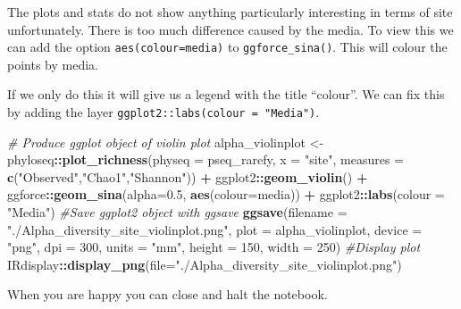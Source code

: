\documentclass[
]{book}
\newenvironment{Shaded}{\begin{snugshade}}{\end{snugshade}}
\newcommand{\AttributeTok}[1]{\textcolor[rgb]{0.13,0.29,0.53}{#1}}
\newcommand{\CommentTok}[1]{\textcolor[rgb]{0.56,0.35,0.01}{\textit{#1}}}
\newcommand{\DecValTok}[1]{\textcolor[rgb]{0.00,0.00,0.81}{#1}}
\newcommand{\FloatTok}[1]{\textcolor[rgb]{0.00,0.00,0.81}{#1}}
\newcommand{\FunctionTok}[1]{\textcolor[rgb]{0.13,0.29,0.53}{\textbf{#1}}}
\newcommand{\NormalTok}[1]{#1}
\newcommand{\OtherTok}[1]{\textcolor[rgb]{0.56,0.35,0.01}{#1}}
\newcommand{\SpecialCharTok}[1]{\textcolor[rgb]{0.81,0.36,0.00}{\textbf{#1}}}
\newcommand{\StringTok}[1]{\textcolor[rgb]{0.31,0.60,0.02}{#1}}
\begin{document}
The plots and stats do not show anything particularly interesting in terms of site unfortunately.
There is too much difference caused by the media.
To view this we can add the option \texttt{aes(colour=media)} to \texttt{ggforce\_sina()}.
This will colour the points by media.

If we only do this it will give us a legend with the title ``colour''.
We can fix this by adding the layer \texttt{ggplot2::labs(colour\ =\ "Media")}.

\begin{Shaded}
\begin{Highlighting}[]
\CommentTok{\# Produce ggplot object of violin plot}
\NormalTok{alpha\_violinplot }\OtherTok{\textless{}{-}}\NormalTok{ phyloseq}\SpecialCharTok{::}\FunctionTok{plot\_richness}\NormalTok{(}\AttributeTok{physeq =}\NormalTok{ pseq\_rarefy, }
                        \AttributeTok{x =} \StringTok{"site"}\NormalTok{,}
                        \AttributeTok{measures =} \FunctionTok{c}\NormalTok{(}\StringTok{"Observed"}\NormalTok{,}\StringTok{"Chao1"}\NormalTok{,}\StringTok{"Shannon"}\NormalTok{)) }\SpecialCharTok{+}
\NormalTok{                          ggplot2}\SpecialCharTok{::}\FunctionTok{geom\_violin}\NormalTok{() }\SpecialCharTok{+}
\NormalTok{                          ggforce}\SpecialCharTok{::}\FunctionTok{geom\_sina}\NormalTok{(}\AttributeTok{alpha=}\FloatTok{0.5}\NormalTok{, }\FunctionTok{aes}\NormalTok{(}\AttributeTok{colour=}\NormalTok{media)) }\SpecialCharTok{+}
\NormalTok{                          ggplot2}\SpecialCharTok{::}\FunctionTok{labs}\NormalTok{(}\AttributeTok{colour =} \StringTok{"Media"}\NormalTok{)}
\CommentTok{\#Save ggplot2 object with ggsave}
\FunctionTok{ggsave}\NormalTok{(}\AttributeTok{filename =} \StringTok{"./Alpha\_diversity\_site\_violinplot.png"}\NormalTok{, }\AttributeTok{plot =}\NormalTok{ alpha\_violinplot,}
       \AttributeTok{device =} \StringTok{"png"}\NormalTok{, }\AttributeTok{dpi =} \DecValTok{300}\NormalTok{, }\AttributeTok{units =} \StringTok{"mm"}\NormalTok{, }\AttributeTok{height =} \DecValTok{150}\NormalTok{, }\AttributeTok{width =} \DecValTok{250}\NormalTok{)}
\CommentTok{\#Display plot}
\NormalTok{IRdisplay}\SpecialCharTok{::}\FunctionTok{display\_png}\NormalTok{(}\AttributeTok{file=}\StringTok{"./Alpha\_diversity\_site\_violinplot.png"}\NormalTok{)}
\end{Highlighting}
\end{Shaded}

When you are happy you can close and halt the notebook.
\end{document}

